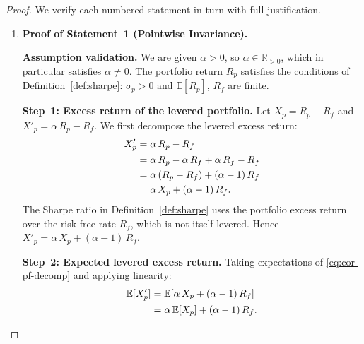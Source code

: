 \documentclass[12pt,openany]{book}
\newcommand{\E}{\mathbb{E}}
\numberwithin{equation}{chapter}
\theoremstyle{plain}
\theoremstyle{definition}
\theoremstyle{remark}
\numberwithin{equation}{chapter}
\theoremstyle{plain}
\begin{document}
\begin{proof}
We verify each numbered statement in turn with full justification.

\begin{enumerate}
  \item \textbf{Proof of Statement~1 (Pointwise Invariance).}

        \noindent
        \textbf{Assumption validation.}
        We are given $\alpha > 0$, so $\alpha \in \mathbb{R}_{>0}$,
        which in particular satisfies $\alpha \neq 0$.
        The portfolio return $R_p$ satisfies the conditions of
        Definition~\ref{def:sharpe}: $\sigma_p > 0$ and
        $\E[R_p]$, $R_f$ are finite.

        \noindent
        \textbf{Step~1: Excess return of the levered portfolio.}
        Let $X_p = R_p - R_f$ and
        $X'_p = \alpha\,R_p - R_f$.  We first decompose
        the levered excess return:
        \begin{align}
          X'_p
            &= \alpha\,R_p - R_f \notag \\
            &= \alpha\,R_p - \alpha\,R_f
               + \alpha\,R_f - R_f \notag \\
            &= \alpha\,(R_p - R_f)
               + (\alpha - 1)\,R_f \notag \\
            &= \alpha\,X_p
               + (\alpha - 1)\,R_f.
          \label{eq:cor-pf-decomp}
        \end{align}
        The Sharpe ratio in Definition~\ref{def:sharpe}
        uses the portfolio excess return over the risk-free
        rate $R_f$, which is not itself levered.  Hence
        $X'_p = \alpha\,X_p + (\alpha-1)\,R_f$.

        \noindent
        \textbf{Step~2: Expected levered excess return.}
        Taking expectations of \eqref{eq:cor-pf-decomp}
        and applying linearity:
        \begin{align}
          \E[X'_p]
            &= \E\!\left[
                 \alpha\,X_p + (\alpha-1)\,R_f
               \right] \notag \\
            &= \alpha\,\E[X_p]
               + (\alpha-1)\,R_f.
          \label{eq:cor-pf-mean2}
        \end{align}


\end{enumerate}
\end{proof}
\end{document}
